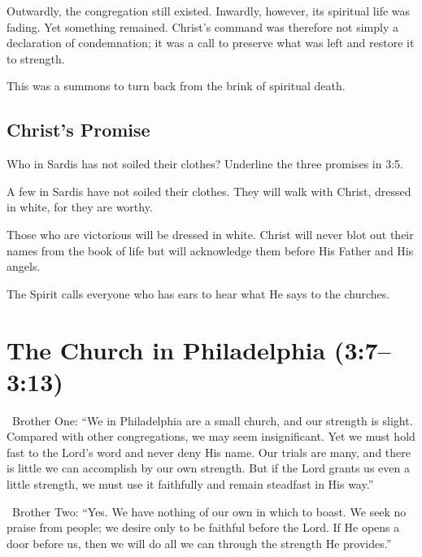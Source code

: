 Outwardly, the congregation still existed. Inwardly, however, its spiritual life was fading. Yet something remained. Christ's command was therefore not simply a declaration of condemnation; it was a call to preserve what was left and restore it to strength.

This was a summons to turn back from the brink of spiritual death.

\subsection{Christ's Promise}

\begin{ScriptureBox2}{Who in Sardis has not soiled their clothes? Underline the three promises in 3:5.}
\item[3:4] A few in Sardis have not soiled their clothes. They will walk with Christ, dressed in white, for they are worthy.

\item[3:5] Those who are victorious will be dressed in white. Christ will never blot out their names from the book of life but will acknowledge them before His Father and His angels.

\item[3:6] The Spirit calls everyone who has ears to hear what He says to the churches.
\end{ScriptureBox2}

\section{The Church in Philadelphia (3:7--3:13)}

\begin{DialogueBox}
\noindent\faUser\ Brother One: ``We in Philadelphia are a small church, and our strength is slight. Compared with other congregations, we may seem insignificant. Yet we must hold fast to the Lord's word and never deny His name. Our trials are many, and there is little we can accomplish by our own strength. But if the Lord grants us even a little strength, we must use it faithfully and remain steadfast in His way.''

\vspace{0.1cm}

\noindent\faUser\ Brother Two: ``Yes. We have nothing of our own in which to boast. We seek no praise from people; we desire only to be faithful before the Lord. If He opens a door before us, then we will do all we can through the strength He provides.''
\end{DialogueBox}


